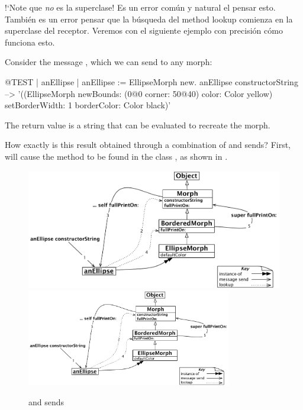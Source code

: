 \documentclass[a4paper,10pt,twoside]{book}
\begin{document}
!`Note que \super \emph{no} es la superclase!
Es un error com\'un y natural el pensar esto.
Tambi\'en es un error pensar que la b\'usqueda del method lookup comienza en la superclase del receptor.
Veremos con el siguiente ejemplo con precisi\'on c\'omo funciona esto.

Consider the message , which we can send to any morph:
\begin{code}{@TEST | anEllipse | anEllipse := EllipseMorph new.}
anEllipse constructorString --> '((EllipseMorph newBounds: (0@0 corner: 50@40) color: Color yellow) setBorderWidth: 1 borderColor: Color black)'
\end{code}
The return value is a string that can be evaluated to recreate the morph.

How exactly is this result obtained through a combination of \self and \super sends?
First,  will cause the method  to be found in the class ,
as shown in .

\begin{figure}[htb]
\begin{center}
\ifluluelse
	{\includegraphics[width=\textwidth]{constructorStringLookup}}
	{\includegraphics[width=0.8\textwidth]{constructorStringLookup}}
\caption{\self and \super sends}
\end{center}
\end{figure}
\end{document}
